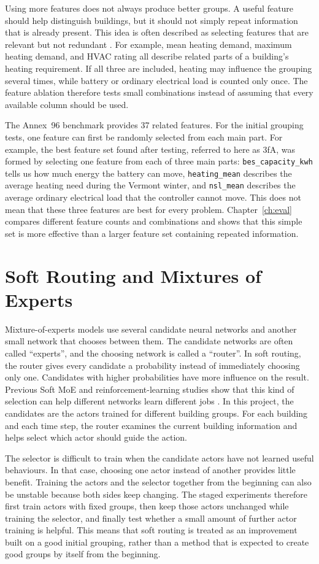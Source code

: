 Using more features does not always produce better groups. A useful feature
should help distinguish buildings, but it should not simply repeat information
that is already present. This idea is often described as selecting features
that are relevant but not redundant \cite{peng2005mrmr}. For example, mean
heating demand, maximum heating demand, and HVAC rating all describe related
parts of a building's heating requirement. If all three are included, heating
may influence the grouping several times, while battery or ordinary electrical
load is counted only once. The feature ablation therefore tests small
combinations instead of assuming that every available column should be used.


The Annex~96 benchmark provides 37 related features. For the initial grouping
tests, one feature can first be randomly selected from each main part. For
example, the best feature set found after testing, referred to here as 3fA, was
formed by selecting one feature from each of three main parts:
\texttt{bes\_capacity\_kwh} tells us how much energy the battery can move,
\texttt{heating\_mean} describes the average heating need during the Vermont
winter, and \texttt{nsl\_mean} describes the average ordinary electrical load
that the controller cannot move. This does not mean that these three features
are best for every problem. Chapter~\ref{ch:eval} compares different feature
counts and combinations and shows that this simple set is more effective than a
larger feature set containing repeated information.


\section{Soft Routing and Mixtures of Experts}

Mixture-of-experts models use several candidate neural networks and another
small network that chooses between them. The candidate networks are often
called ``experts'', and the choosing network is called a ``router''. In soft
routing, the router gives every candidate a probability instead of immediately
choosing only one. Candidates with higher probabilities have more influence on
the result. Previous Soft MoE and reinforcement-learning studies show that this
kind of selection can help different networks learn different jobs
\cite{puigcerver2024softmoe,obandoceron2024moerl}. In this project, the
candidates are the actors trained for different building groups. For each
building and each time step, the router examines the current building
information and helps select which actor should guide the action.


The selector is difficult to train when the candidate actors have not learned
useful behaviours. In that case, choosing one actor instead of another provides
little benefit. Training the actors and the selector together from the beginning
can also be unstable because both sides keep changing. The staged experiments
therefore first train actors with fixed groups, then keep those actors unchanged
while training the selector, and finally test whether a small amount of further
actor training is helpful. This means that soft routing is treated as an
improvement built on a good initial grouping, rather than a method that is
expected to create good groups by itself from the beginning.
